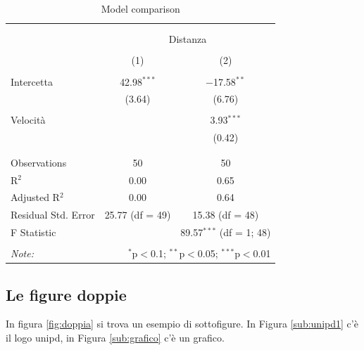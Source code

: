 \documentclass[
]{article}
\begin{document}
\begin{table}[!htbp] \centering 
  \caption{Model comparison} 
  \label{tab:modelli} 
\begin{tabular}{@{\extracolsep{5pt}}lcc} 
\\[-1.8ex]\hline 
\hline \\[-1.8ex] 
\\[-1.8ex] & \multicolumn{2}{c}{Distanza} \\ 
\\[-1.8ex] & (1) & (2)\\ 
\hline \\[-1.8ex] 
 Intercetta & 42.98$^{***}$ & $-$17.58$^{**}$ \\ 
  & (3.64) & (6.76) \\ 
  & & \\ 
 Velocità &  & 3.93$^{***}$ \\ 
  &  & (0.42) \\ 
  & & \\ 
\hline \\[-1.8ex] 
Observations & 50 & 50 \\ 
R$^{2}$ & 0.00 & 0.65 \\ 
Adjusted R$^{2}$ & 0.00 & 0.64 \\ 
Residual Std. Error & 25.77 (df = 49) & 15.38 (df = 48) \\ 
F Statistic &  & 89.57$^{***}$ (df = 1; 48) \\ 
\hline 
\hline \\[-1.8ex] 
\textit{Note:}  & \multicolumn{2}{r}{$^{*}$p$<$0.1; $^{**}$p$<$0.05; $^{***}$p$<$0.01} \\ 
\end{tabular} 
\end{table}

\hypertarget{le-figure-doppie}{%
\subsection{Le figure doppie}\label{le-figure-doppie}}

In figura \ref{fig:doppia} si trova un esempio di sottofigure. In Figura
\ref{sub:unipd1} c'è il logo unipd, in Figura \ref{sub:grafico} c'è un
grafico.
\end{document}
